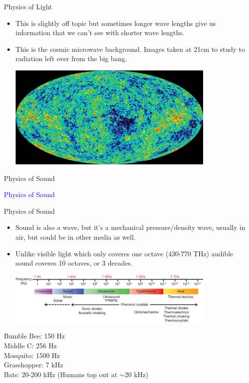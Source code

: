 \documentclass{beamer}
\begin{document}
\begin{frame}{Physics of Light}
   \begin{itemize}
      \item This is slightly off topic but sometimes longer wave lengths give us information that we can't see with shorter wave lengths.
      \item This is the cosmic microwave background. Images taken at 21cm to study to radiation left over from the big bang.
      \begin{center}
      \includegraphics[width=0.8\textwidth]{figures/cmb.jpg}
      \end{center}
   \end{itemize}
\end{frame}

\begin{frame}{Physics of Sound}
   \begin{center}
      \Huge \textcolor{blue}{Physics of Sound}
   \end{center}
\end{frame}

\begin{frame}{Physics of Sound}
   \begin{itemize}
      \item Sound is also a wave, but it's a mechanical pressure/density wave, usually in air, but could be in other media as well.
      \item Unlike visible light which only coveres one octave (430-770 THz) audible sound coveres 10 octaves, or 3 decades.
      \begin{center}
      \includegraphics[width=0.8\textwidth]{figures/soundspectrum.jpg}
      \end{center}
   \end{itemize}
   Bumble Bee: 150 Hz \\
   Middle C: 256 Hz \\
   Mosquito: 1500 Hz \\
   Grasshopper: 7 kHz \\
   Bats: 20-200 kHz (Humans top out at $\sim$20 kHz)
\end{frame}
\end{document}
